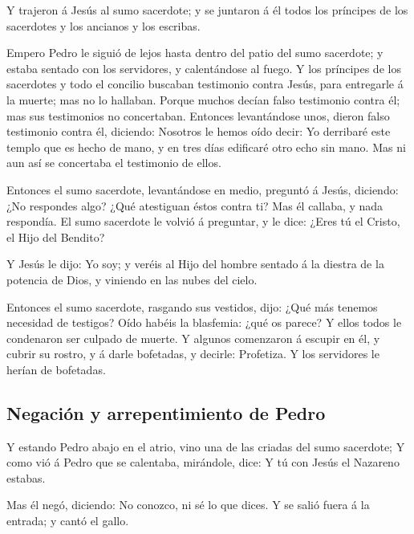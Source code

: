  Y trajeron á Jesús al sumo sacerdote; y se juntaron á él
todos los príncipes de los sacerdotes y los ancianos y los escribas.

 Empero Pedro le siguió de lejos hasta dentro del patio
del sumo sacerdote; y estaba sentado con los servidores, y calentándose
al fuego.  Y los príncipes de los sacerdotes y todo el
concilio buscaban testimonio contra Jesús, para entregarle á la muerte;
mas no lo hallaban.  Porque muchos decían falso
testimonio contra él; mas sus testimonios no concertaban.
 Entonces levantándose unos, dieron falso testimonio
contra él, diciendo:  Nosotros le hemos oído decir: Yo
derribaré este templo que es hecho de mano, y en tres días edificaré
otro echo sin mano.  Mas ni aun así se concertaba el
testimonio de ellos.

 Entonces el sumo sacerdote, levantándose en medio,
preguntó á Jesús, diciendo: ¿No respondes algo? ¿Qué atestiguan éstos
contra ti?  Mas él callaba, y nada respondía. El sumo
sacerdote le volvió á preguntar, y le dice: ¿Eres tú el Cristo, el Hijo
del Bendito?

 Y Jesús le dijo: Yo soy; y veréis al Hijo del hombre
sentado á la diestra de la potencia de Dios, y viniendo en las nubes del
cielo.

 Entonces el sumo sacerdote, rasgando sus vestidos, dijo:
¿Qué más tenemos necesidad de testigos?  Oído habéis la
blasfemia: ¿qué os parece? Y ellos todos le condenaron ser culpado de
muerte.  Y algunos comenzaron á escupir en él, y cubrir
su rostro, y á darle bofetadas, y decirle: Profetiza. Y los servidores
le herían de bofetadas.

\hypertarget{negaciuxf3n-y-arrepentimiento-de-pedro}{%
\subsection{Negación y arrepentimiento de
Pedro}\label{negaciuxf3n-y-arrepentimiento-de-pedro}}

 Y estando Pedro abajo en el atrio, vino una de las
criadas del sumo sacerdote;  Y como vió á Pedro que se
calentaba, mirándole, dice: Y tú con Jesús el Nazareno estabas.

 Mas él negó, diciendo: No conozco, ni sé lo que dices. Y
se salió fuera á la entrada; y cantó el gallo.

